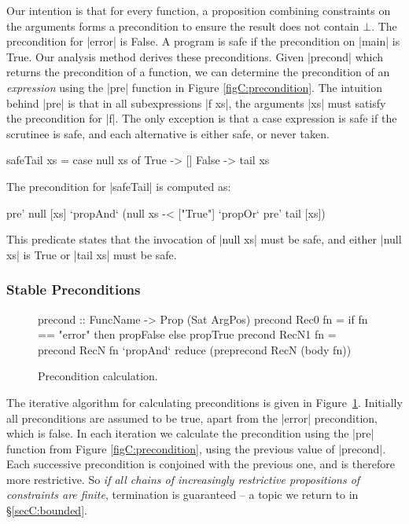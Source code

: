 Our intention is that for every function, a proposition combining constraints on the arguments forms a precondition to ensure the result does not contain $\bot{}$. The precondition for |error| is False. A program is safe if the precondition on |main| is True. Our analysis method derives these preconditions. Given |precond| which returns the precondition of a function, we can determine the precondition of an \textit{expression} using the |pre| function in Figure \ref{figC:precondition}. The intuition behind |pre| is that in all subexpressions |f xs|, the arguments |xs| must satisfy the precondition for |f|. The only exception is that a case expression is safe if the scrutinee is safe, and each alternative is either safe, or never taken.

\begin{example}
\label{exC:safeTail}
\begin{code}
safeTail xs = case  null xs of
                    True   -> []
                    False  -> tail xs
\end{code}

\noindent The precondition for |safeTail| is computed as:

\ignore\begin{code}
pre' null [xs] `propAnd` (null xs -< ["True"] `propOr` pre' tail [xs])
\end{code}

This predicate states that the invocation of |null xs| must be safe, and either |null xs| is True or |tail xs| must be safe.
\end{example}


\subsubsection{Stable Preconditions}
\label{secC:fixp_precond}


\begin{figure}
\ignore\begin{code}
precond  :: FuncName -> Prop (Sat ArgPos)
precond Rec0   fn =  if fn == "error" then propFalse else propTrue
precond RecN1  fn =  precond RecN fn `propAnd`
                     reduce (pre{precond RecN} (body fn))
\end{code}
\caption{Precondition calculation.}
\label{figC:precond_fixp}
\end{figure}

The iterative algorithm for calculating preconditions is given in Figure~\ref{figC:precond_fixp}. Initially all preconditions are assumed to be true, apart from the |error| precondition, which is false. In each iteration we calculate the precondition using the |pre| function from Figure \ref{figC:precondition}, using the previous value of |precond|. Each successive precondition is conjoined with the previous one, and is therefore more restrictive. So \textit{if all chains of increasingly restrictive propositions of constraints are finite}, termination is guaranteed -- a topic we return to in \S\ref{secC:bounded}.

